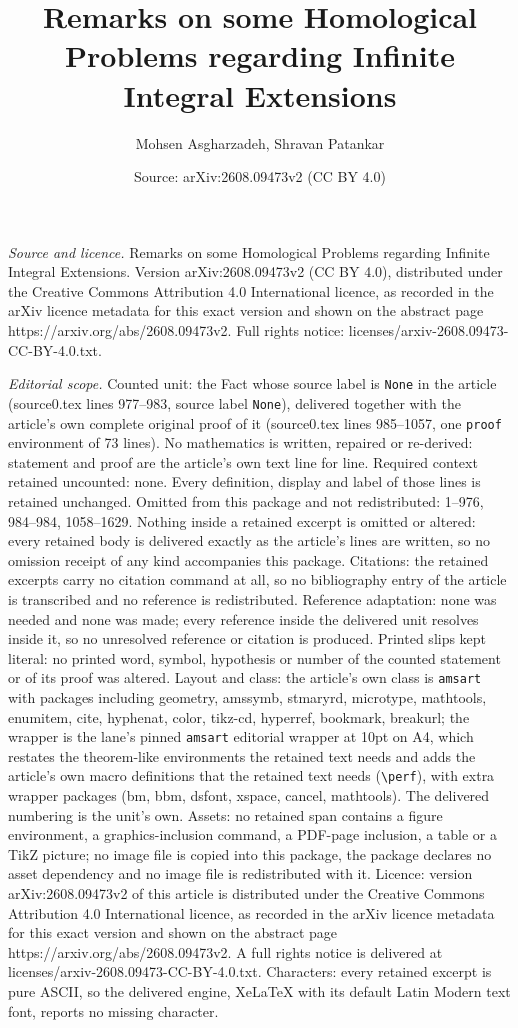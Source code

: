 \documentclass[10pt,a4paper]{amsart}
\title[Remarks on some Homological Problems regarding Infinite Inte]{Remarks on some Homological Problems regarding Infinite Integral Extensions}
\author{Mohsen Asgharzadeh, Shravan Patankar}
\date{Source: arXiv:2608.09473v2 (CC BY 4.0)}
\begin{document}
\maketitle

\noindent\emph{Source and licence.} Remarks on some Homological Problems regarding Infinite Integral Extensions. Version arXiv:2608.09473v2 (CC BY 4.0), distributed under the Creative Commons Attribution 4.0 International licence, as recorded in the arXiv licence metadata for this exact version and shown on the abstract page https://arxiv.org/abs/2608.09473v2. Full rights notice: licenses/arxiv-2608.09473-CC-BY-4.0.txt.\par\smallskip

\noindent\textit{Editorial scope.} Counted unit: the Fact whose source label is \texttt{None} in the article (source0.tex lines 977--983, source label \texttt{None}), delivered together with the article's own complete original proof of it (source0.tex lines 985--1057, one \texttt{proof} environment of 73 lines). No mathematics is written, repaired or re-derived: statement and proof are the article's own text line for line. Required context retained uncounted: none. Every definition, display and label of those lines is retained unchanged. Omitted from this package and not redistributed: 1--976, 984--984, 1058--1629. Nothing inside a retained excerpt is omitted or altered: every retained body is delivered exactly as the article's lines are written, so no omission receipt of any kind accompanies this package. Citations: the retained excerpts carry no citation command at all, so no bibliography entry of the article is transcribed and no reference is redistributed. Reference adaptation: none was needed and none was made; every reference inside the delivered unit resolves inside it, so no unresolved reference or citation is produced. Printed slips kept literal: no printed word, symbol, hypothesis or number of the counted statement or of its proof was altered. Layout and class: the article's own class is \texttt{amsart} with packages including geometry, amssymb, stmaryrd, microtype, mathtools, enumitem, cite, hyphenat, color, tikz-cd, hyperref, bookmark, breakurl; the wrapper is the lane's pinned \texttt{amsart} editorial wrapper at 10pt on A4, which restates the theorem-like environments the retained text needs and adds the article's own macro definitions that the retained text needs (\texttt{\textbackslash perf}), with extra wrapper packages (bm, bbm, dsfont, xspace, cancel, mathtools). The delivered numbering is the unit's own. Assets: no retained span contains a figure environment, a graphics-inclusion command, a PDF-page inclusion, a table or a TikZ picture; no image file is copied into this package, the package declares no asset dependency and no image file is redistributed with it. Licence: version arXiv:2608.09473v2 of this article is distributed under the Creative Commons Attribution 4.0 International licence, as recorded in the arXiv licence metadata for this exact version and shown on the abstract page https://arxiv.org/abs/2608.09473v2. A full rights notice is delivered at licenses/arxiv-2608.09473-CC-BY-4.0.txt. Characters: every retained excerpt is pure ASCII, so the delivered engine, XeLaTeX with its default Latin Modern text font, reports no missing character.
\end{document}
